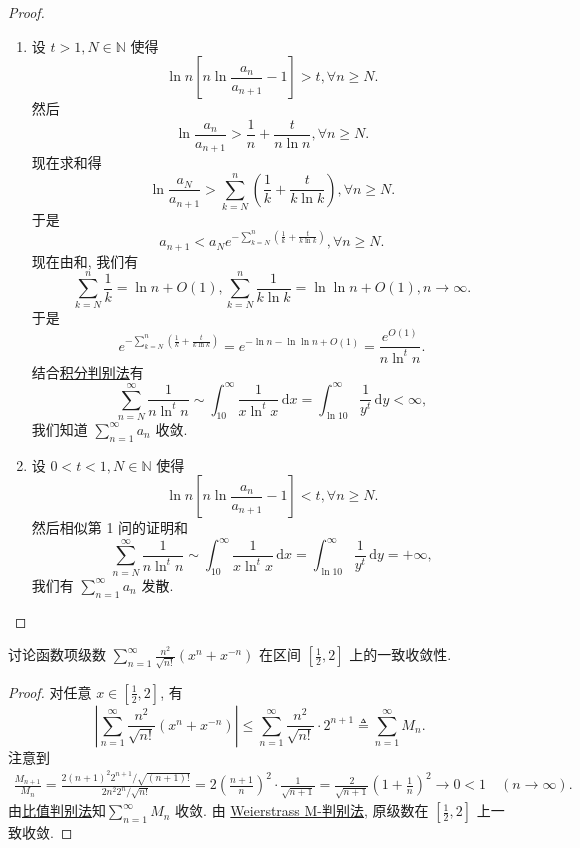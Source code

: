 \documentclass[../../main.tex]{subfiles}%
\begin{document}
\begin{proof}
\begin{enumerate}
\item 设 \( t > 1, N \in \mathbb{N} \) 使得
\[
\ln n \left[ n \ln \frac{a_n}{a_{n + 1}} - 1 \right] > t, \forall n \geqslant N.
\]
然后
\[
\ln \frac{a_n}{a_{n + 1}} > \frac{1}{n} + \frac{t}{n \ln n}, \forall n \geqslant N.
\]
现在求和得
\[
\ln \frac{a_N}{a_{n + 1}} > \sum_{k=N}^n \left( \frac{1}{k} + \frac{t}{k \ln k} \right), \forall n \geqslant N.
\]
于是
\[
a_{n + 1} < a_N e^{-\sum\limits_{k=N}^n \left( \frac{1}{k} + \frac{t}{k \ln k} \right)}, \forall n \geqslant N.
\]
现在由和, 我们有
\[
\sum_{k=N}^n \frac{1}{k} = \ln n + O(1), \sum_{k=N}^n \frac{1}{k \ln k} = \ln \ln n + O(1), n \to \infty.
\]
于是
\[
e^{-\sum\limits_{k=N}^n \left( \frac{1}{k} + \frac{t}{k \ln k} \right)} = e^{-\ln n - \ln \ln n + O(1)} = \frac{e^{O(1)}}{n \ln^t n}.
\]
结合\hyperref[theorem:积分判别法]{积分判别法}有
\[
\sum_{n=N}^\infty \frac{1}{n \ln^t n} \sim \int_{10}^\infty \frac{1}{x \ln^t x} \, \mathrm{d}x = \int_{\ln 10}^\infty \frac{1}{y^t} \, \mathrm{d}y < \infty,
\]
我们知道 \( \sum_{n=1}^\infty a_n \) 收敛.

\item 设 \( 0 < t < 1, N \in \mathbb{N} \) 使得
\[
\ln n \left[ n \ln \frac{a_n}{a_{n + 1}} - 1 \right] < t, \forall n \geqslant N.
\]
然后相似第 1 问的证明和
\[
\sum_{n=N}^\infty \frac{1}{n \ln^t n} \sim \int_{10}^\infty \frac{1}{x \ln^t x} \, \mathrm{d}x = \int_{\ln 10}^\infty \frac{1}{y^t} \, \mathrm{d}y = +\infty,
\]
我们有 \( \sum_{n=1}^\infty a_n \) 发散.
\end{enumerate}
\end{proof}

\begin{example}
讨论函数项级数 $\sum\limits_{n=1}^\infty \frac{n^2}{\sqrt{n!}} (x^n + x^{-n})$ 在区间 $\left[\frac{1}{2}, 2\right]$ 上的一致收敛性.
\end{example}
\begin{proof}
对任意 $x \in \left[\frac{1}{2}, 2\right]$, 有
\[
\left| \sum\limits_{n=1}^\infty \frac{n^2}{\sqrt{n!}} (x^n + x^{-n}) \right|
\leqslant \sum\limits_{n=1}^\infty\frac{n^2}{\sqrt{n!}} \cdot 2^{n+1}
\triangleq \sum\limits_{n=1}^\infty M_n.
\]
注意到
\begin{align*}
\frac{M_{n+1}}{M_n}
= \frac{2(n+1)^2 2^{n+1} / \sqrt{(n+1)!}}{2n^2 2^n / \sqrt{n!}} = 2 \left( \frac{n+1}{n} \right)^2 \cdot \frac{1}{\sqrt{n+1}} = \frac{2}{\sqrt{n+1}} \left(1 + \frac{1}{n}\right)^2 \to 0<1 \quad (n \to \infty).
\end{align*}
由\hyperref[theorem:级数-比值判别法]{比值判别法}知$\sum\limits_{n=1}^\infty M_n$ 收敛. 由 \hyperref[theorem:Weierstrass(魏尔斯特拉斯)判别法]{Weierstrass M-判别法}, 原级数在 $\left[\frac{1}{2}, 2\right]$ 上一致收敛.
\end{proof}
\end{document}
